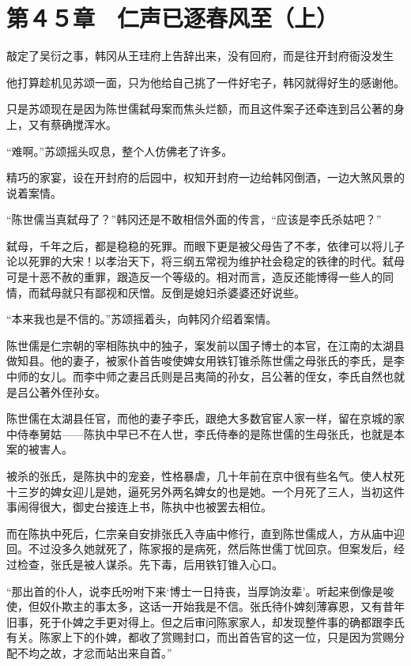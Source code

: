 \section{第４５章　仁声已逐春风至（上）}

敲定了吴衍之事，韩冈从王珪府上告辞出来，没有回府，而是往开封府衙没发生

他打算趁机见苏颂一面，只为他给自己挑了一件好宅子，韩冈就得好生的感谢他。

只是苏颂现在是因为陈世儒弑母案而焦头烂额，而且这件案子还牵连到吕公著的身上，又有蔡确搅浑水。

“难啊。”苏颂摇头叹息，整个人仿佛老了许多。

精巧的家宴，设在开封府的后园中，权知开封府一边给韩冈倒酒，一边大煞风景的说着案情。

“陈世儒当真弑母了？”韩冈还是不敢相信外面的传言，“应该是李氏杀姑吧？”

弑母，千年之后，都是稳稳的死罪。而眼下更是被父母告了不孝，依律可以将儿子论以死罪的大宋！以孝治天下，将三纲五常视为维护社会稳定的铁律的时代。弑母可是十恶不赦的重罪，跟造反一个等级的。相对而言，造反还能博得一些人的同情，而弑母就只有鄙视和厌憎。反倒是媳妇杀婆婆还好说些。

“本来我也是不信的。”苏颂摇着头，向韩冈介绍着案情。

陈世儒是仁宗朝的宰相陈执中的独子，案发前以国子博士的本官，在江南的太湖县做知县。他的妻子，被家仆首告唆使婢女用铁钉锥杀陈世儒之母张氏的李氏，是李中师的女儿。而李中师之妻吕氏则是吕夷简的孙女，吕公著的侄女，李氏自然也就是吕公著外侄孙女。

陈世儒在太湖县任官，而他的妻子李氏，跟绝大多数官宦人家一样，留在京城的家中侍奉舅姑——陈执中早已不在人世，李氏侍奉的是陈世儒的生母张氏，也就是本案的被害人。

被杀的张氏，是陈执中的宠妾，性格暴虐，几十年前在京中很有些名气。使人杖死十三岁的婢女迎儿是她，逼死另外两名婢女的也是她。一个月死了三人，当初这件事闹得很大，御史台接连上书，陈执中也被罢去相位。

而在陈执中死后，仁宗亲自安排张氏入寺庙中修行，直到陈世儒成人，方从庙中迎回。不过没多久她就死了，陈家报的是病死，然后陈世儒丁忧回京。但案发后，经过检查，张氏是被人谋杀。先下毒，后用铁钉锥入心口。

“那出首的仆人，说李氏吩咐下来‘博士一日持丧，当厚饷汝辈’。听起来倒像是唆使，但奴仆欺主的事太多，这话一开始我是不信。张氏待仆婢刻薄寡恩，又有昔年旧事，死于仆婢之手更对得上。但之后审问陈家家人，却发现整件事的确都跟李氏有关。陈家上下的仆婢，都收了赏赐封口，而出首告官的这一位，只是因为赏赐分配不均之故，才忿而站出来自首。”

